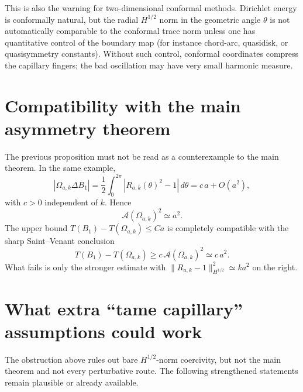 \documentclass[11pt]{article}
\newcommand{\Om}{\Omega}
\begin{document}
This is also the warning for two-dimensional conformal methods.  Dirichlet
energy is conformally natural, but the radial \(H^{1/2}\) norm in the
geometric angle \(\theta\) is not automatically comparable to the conformal
trace norm unless one has quantitative control of the boundary map
(for instance chord-arc, quasidisk, or quasisymmetry constants).  Without such
control, conformal coordinates compress the capillary fingers; the bad
oscillation may have very small harmonic measure.

\section{Compatibility with the main asymmetry theorem}

The previous proposition must not be read as a counterexample to the main
theorem.  In the same example,
\[
   |\Om_{a,k}\Delta B_1|
      =\frac12\int_0^{2\pi}|R_{a,k}(\theta)^2-1|\,d\theta
      = c\,a+O(a^2),
\]
with \(c>0\) independent of \(k\).  Hence
\[
   \mathcal A(\Om_{a,k})^2\simeq a^2.
\]
The upper bound \(T(B_1)-T(\Om_{a,k})\le Ca\) is completely compatible with
the sharp Saint--Venant conclusion
\[
   T(B_1)-T(\Om_{a,k})\ge c\,\mathcal A(\Om_{a,k})^2\simeq c\,a^2.
\]
What fails is only the stronger estimate with
\(\|R_{a,k}-1\|_{H^{1/2}}^2\simeq ka^2\) on the right.

\section{What extra ``tame capillary'' assumptions could work}

The obstruction above rules out bare \(H^{1/2}\)-norm coercivity, but not the
main theorem and not every perturbative route.  The following strengthened
statements remain plausible or already available.
\end{document}
